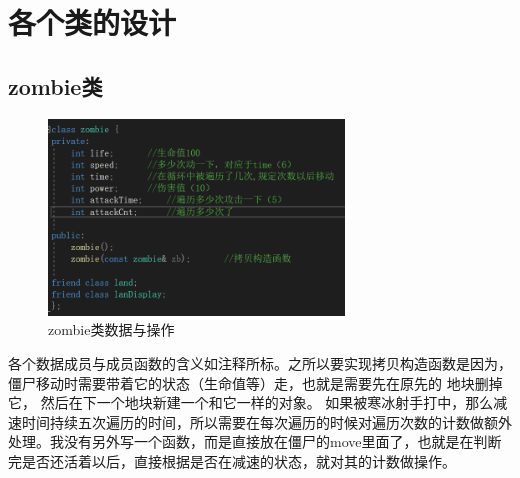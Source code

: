 \documentclass[12pt,a4paper,UTF8]{article}
\begin{document}
\section{各个类的设计}
    \subsection{zombie类}
      \begin{figure}[H]
        \centering
      \includegraphics[width=0.7\textwidth]{figure/zombie.png}
      \caption{zombie类数据与操作}
    \end{figure}
      各个数据成员与成员函数的含义如注释所标。之所以要实现拷贝构造函数是因为，僵尸移动时需要带着它的状态（生命值等）走，也就是需要先在原先的
      地块删掉它， 然后在下一个地块新建一个和它一样的对象。
      如果被寒冰射手打中，那么减速时间持续五次遍历的时间，所以需要在每次遍历的时候对遍历次数的计数做额外处理。我没有另外写一个函数，而是直接放在僵尸的move里面了，也就是在判断
      完是否还活着以后，直接根据是否在减速的状态，就对其的计数做操作。
\end{document}
